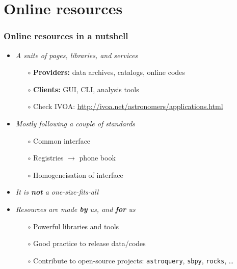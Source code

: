 \section{Online resources}

\begin{frame}
  \frametitle{Online resources in a nutshell}

  \begin{itemize}[<+->]
    \item \emph{A suite of pages, libraries, and services}
      \begin{itemize}[<.->]
        \item[$\circ$] \textbf{Providers:} data archives, catalogs, online codes
        \item[$\circ$] \textbf{Clients:} GUI, CLI, analysis tools
        \item[$\circ$] Check IVOA: \url{http://ivoa.net/astronomers/applications.html}
      \end{itemize}

    \vspace{1em}
    \item \emph{Mostly following a couple of standards}
      \begin{itemize}[<.->]
        \item[$\circ$] Common interface 
        \item[$\circ$] Registries $\rightarrow$ phone book
        \item[$\circ$] Homogeneisation of interface 
      \end{itemize}

    \vspace{1em}
    \item \emph{It is \textbf{not} a one-size-fits-all}

    \vspace{1em}
    \item \emph{Resources are made \textbf{by} us, and \textbf{for} us}
      \begin{itemize}[<.->]
        \item[$\circ$] Powerful libraries and tools
        \item[$\circ$] Good practice to release data/codes 
        \item[$\circ$] Contribute to open-source projects: \texttt{astroquery}, \texttt{sbpy}, \texttt{rocks}, \dots
      \end{itemize}

  \end{itemize}

\end{frame}

